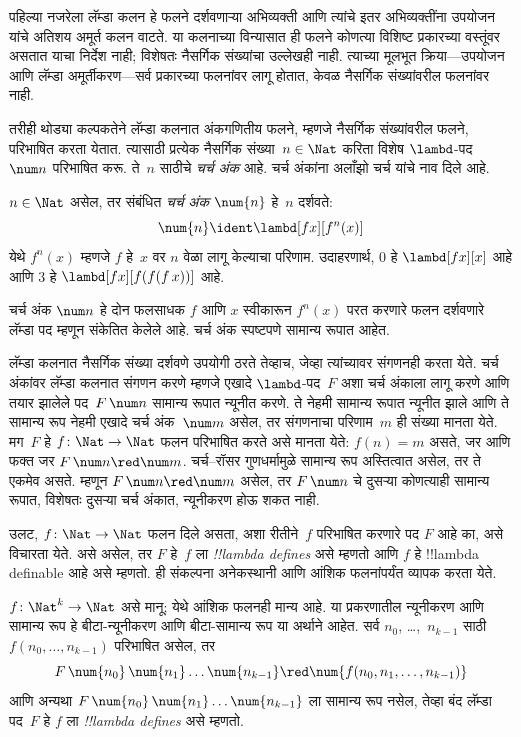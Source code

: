 \documentclass[../../../include/open-logic-section]{subfiles}
\begin{document}

पहिल्या नजरेला लॅम्डा कलन हे फलने दर्शवणाऱ्या
अभिव्यक्ती आणि त्यांचे इतर अभिव्यक्तींना उपयोजन
यांचे अतिशय अमूर्त कलन वाटते. या कलनाच्या
विन्यासात ही फलने कोणत्या विशिष्ट प्रकारच्या वस्तूंवर
असतात याचा निर्देश नाही; विशेषतः नैसर्गिक संख्यांचा
उल्लेखही नाही. त्याच्या मूलभूत क्रिया—उपयोजन आणि
लॅम्डा अमूर्तीकरण—सर्व प्रकारच्या फलनांवर लागू
होतात, केवळ नैसर्गिक संख्यांवरील फलनांवर नाही.

तरीही थोड्या कल्पकतेने लॅम्डा कलनात अंकगणितीय
फलने, म्हणजे नैसर्गिक संख्यांवरील फलने, परिभाषित
करता येतात. त्यासाठी प्रत्येक नैसर्गिक संख्या~$n \in
\Nat$ करिता विशेष $\lambd$-पद~$\num n$ परिभाषित
करू. ते~$n$ साठीचे \emph{चर्च अंक} आहे. चर्च अंकांना
अलाँझो चर्च यांचे नाव दिले आहे.

\begin{defn}
  $n \in \Nat$ असेल, तर संबंधित \emph{चर्च अंक}
  $\num{n}$ हे~$n$ दर्शवते:
  \[
    \num{n} \ident \lambd[fx][f^n(x)]
  \]
  येथे $f^n(x)$ म्हणजे $f$ हे~$x$ वर $n$ वेळा लागू
  केल्याचा परिणाम. उदाहरणार्थ, $\num{0}$ हे
  $\lambd[fx][x]$ आहे आणि $\num{3}$ हे
  $\lambd[fx][f(f(f\,x))]$ आहे.
\end{defn}

चर्च अंक $\num n$ हे दोन फलसाधक $f$ आणि $x$
स्वीकारून $f^n(x)$ परत करणारे फलन दर्शवणारे लॅम्डा
पद म्हणून संकेतित केलेले आहे. चर्च अंक स्पष्टपणे
सामान्य रूपात आहेत.

लॅम्डा कलनात नैसर्गिक संख्या दर्शवणे उपयोगी ठरते
तेव्हाच, जेव्हा त्यांच्यावर संगणनही करता येते.
चर्च अंकांवर लॅम्डा कलनात संगणन करणे म्हणजे
एखादे $\lambd$-पद~$F$ अशा चर्च अंकाला लागू करणे
आणि तयार झालेले पद~$F\, \num n$ सामान्य रूपात
न्यूनीत करणे. ते नेहमी सामान्य रूपात न्यूनीत झाले
आणि ते सामान्य रूप नेहमी एखादे चर्च अंक~$\num m$
असेल, तर संगणनाचा परिणाम~$m$ ही संख्या मानता येते.
मग~$F$ हे $f\colon \Nat \to \Nat$ फलन परिभाषित
करते असे मानता येते: $f(n) = m$ असते, जर आणि फक्त जर
$F\, \num n \red \num m$. चर्च–रॉसर गुणधर्मामुळे
सामान्य रूप अस्तित्वात असेल, तर ते एकमेव असते.
म्हणून $F\, \num n \red \num m$ असेल, तर
$F \, \num n$ चे दुसऱ्या कोणत्याही सामान्य रूपात,
विशेषतः दुसऱ्या चर्च अंकात, न्यूनीकरण होऊ शकत नाही.

उलट, $f\colon \Nat \to \Nat$ फलन दिले असता,
अशा रीतीने~$f$ परिभाषित करणारे पद $F$ आहे का,
असे विचारता येते. असे असेल, तर $F$ हे~$f$ ला
\emph{!!{lambda define}s} असे म्हणतो आणि $f$ हे
!!{lambda definable} आहे असे म्हणतो. ही संकल्पना
अनेकस्थानी आणि आंशिक फलनांपर्यंत व्यापक करता येते.

\begin{defn}
$f\colon \Nat^k \to \Nat$ असे मानू; येथे आंशिक
फलनही मान्य आहे. या प्रकरणातील न्यूनीकरण आणि सामान्य
रूप हे बीटा-न्यूनीकरण आणि बीटा-सामान्य रूप या अर्थाने आहेत. सर्व
$n_0$, \dots,~$n_{k-1}$ साठी $f(n_0, \dots,
n_{k-1})$ परिभाषित असेल, तर
\[
F \, \num{n_0} \, \num{n_1} \dots \num{n_{k-1}} \red \num{f(n_0, n_1, \dots,
  n_{k-1})}
\]
आणि अन्यथा $F \, \num{n_0} \,
\num{n_1} \dots \num{n_{k-1}}$ ला सामान्य रूप
नसेल, तेव्हा बंद लॅम्डा पद~$F$ हे $f$ ला
\emph{!!{lambda define}s} असे म्हणतो.
\end{defn}
\end{document}
